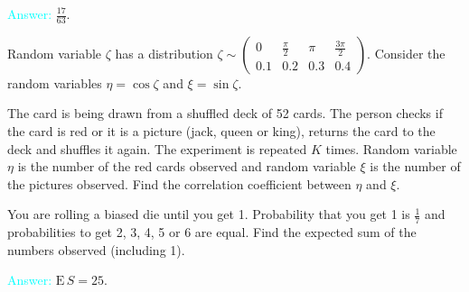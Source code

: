 \documentclass[14pt]{exam}
\def\E{{\textrm{E}}\,}
\begin{document}
\begin{questions}
		\textcolor{cyan}{Answer:} $\frac{17}{63}$.
		
				\question
		Random variable $\zeta$ has a distribution $\zeta \sim \begin{pmatrix}
			0 & \frac{\pi}{2} & \pi & \frac{3\pi}{2}\\
			0.1 & 0.2 & 0.3 & 0.4
		\end{pmatrix}$. Consider the random variables $\eta = \cos \zeta$ and $\xi = \sin\zeta$.
		
		
		\question
		The card is being drawn from a shuffled deck of 52 cards. The person checks if the card is red or it is a picture (jack, queen or king), returns the card to the deck and shuffles it again. The experiment is repeated $K$ times. Random variable $\eta$ is the number of the red cards observed and random variable $\xi$ is the number of the pictures observed. Find the correlation coefficient between $\eta$ and $\xi$.
		
		\question
		You are rolling a biased die until you get 1. Probability that you get 1 is $\frac{1}{7}$ and probabilities to get 2, 3, 4, 5 or 6 are equal. Find the expected sum of the numbers observed (including 1).
		
		\textcolor{cyan}{Answer:} $\E S = 25$.
	\end{questions}
\end{document}
